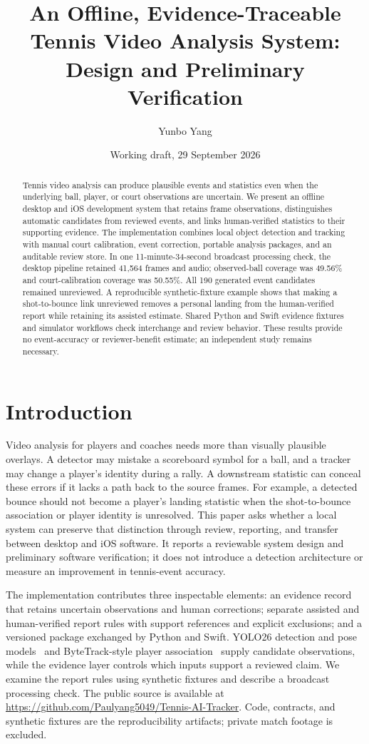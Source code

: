\documentclass[10pt]{article}
\title{An Offline, Evidence-Traceable Tennis Video Analysis System: Design and Preliminary Verification}
\author{Yunbo Yang}
\date{Working draft, 29 September 2026}
\begin{document}
\maketitle
\begin{abstract}
Tennis video analysis can produce plausible events and statistics even when the underlying ball, player, or court observations are uncertain. We present an offline desktop and iOS development system that retains frame observations, distinguishes automatic candidates from reviewed events, and links human-verified statistics to their supporting evidence. The implementation combines local object detection and tracking with manual court calibration, event correction, portable analysis packages, and an auditable review store. In one 11-minute-34-second broadcast processing check, the desktop pipeline retained 41,564 frames and audio; observed-ball coverage was 49.56\% and court-calibration coverage was 50.55\%. All 190 generated event candidates remained unreviewed. A reproducible synthetic-fixture example shows that making a shot-to-bounce link unreviewed removes a personal landing from the human-verified report while retaining its assisted estimate. Shared Python and Swift evidence fixtures and simulator workflows check interchange and review behavior. These results provide no event-accuracy or reviewer-benefit estimate; an independent study remains necessary.
\end{abstract}

\section{Introduction}
Video analysis for players and coaches needs more than visually plausible overlays. A detector may mistake a scoreboard symbol for a ball, and a tracker may change a player's identity during a rally. A downstream statistic can conceal these errors if it lacks a path back to the source frames. For example, a detected bounce should not become a player's landing statistic when the shot-to-bounce association or player identity is unresolved. This paper asks whether a local system can preserve that distinction through review, reporting, and transfer between desktop and iOS software. It reports a reviewable system design and preliminary software verification; it does not introduce a detection architecture or measure an improvement in tennis-event accuracy.

The implementation contributes three inspectable elements: an evidence record that retains uncertain observations and human corrections; separate assisted and human-verified report rules with support references and explicit exclusions; and a versioned package exchanged by Python and Swift. YOLO26 detection and pose models~\cite{yolo26} and ByteTrack-style player association~\cite{bytetrack} supply candidate observations, while the evidence layer controls which inputs support a reviewed claim. We examine the report rules using synthetic fixtures and describe a broadcast processing check. The public source is available at \url{https://github.com/Paulyang5049/Tennis-AI-Tracker}. Code, contracts, and synthetic fixtures are the reproducibility artifacts; private match footage is excluded.
\end{document}
